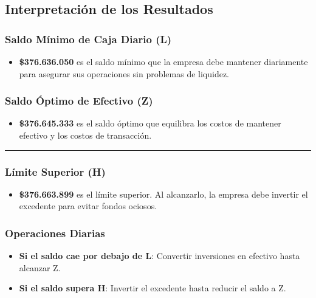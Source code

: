 \documentclass[
  letterpaper,
  DIV=11,
  numbers=noendperiod]{scrartcl}
\providecommand{\tightlist}{%
  \setlength{\itemsep}{0pt}\setlength{\parskip}{0pt}}\usepackage{longtable,booktabs,array}
\begin{document}
\subsection{Interpretación de los
Resultados}\label{interpretaciuxf3n-de-los-resultados}

\subsubsection{Saldo Mínimo de Caja Diario
(L)}\label{saldo-muxednimo-de-caja-diario-l}

\begin{itemize}
\tightlist
\item
  \textbf{\$376.636.050} es el saldo mínimo que la empresa debe mantener
  diariamente para asegurar sus operaciones sin problemas de liquidez.
\end{itemize}

\subsubsection{Saldo Óptimo de Efectivo
(Z)}\label{saldo-uxf3ptimo-de-efectivo-z}

\begin{itemize}
\tightlist
\item
  \textbf{\$376.645.333} es el saldo óptimo que equilibra los costos de
  mantener efectivo y los costos de transacción.
\end{itemize}

\begin{center}\rule{0.5\linewidth}{0.5pt}\end{center}

\subsubsection{Límite Superior (H)}\label{luxedmite-superior-h-1}

\begin{itemize}
\tightlist
\item
  \textbf{\$376.663.899} es el límite superior. Al alcanzarlo, la
  empresa debe invertir el excedente para evitar fondos ociosos.
\end{itemize}

\subsubsection{Operaciones Diarias}\label{operaciones-diarias}

\begin{itemize}
\tightlist
\item
  \textbf{Si el saldo cae por debajo de L}: Convertir inversiones en
  efectivo hasta alcanzar Z.
\item
  \textbf{Si el saldo supera H}: Invertir el excedente hasta reducir el
  saldo a Z.
\end{itemize}
\end{document}
